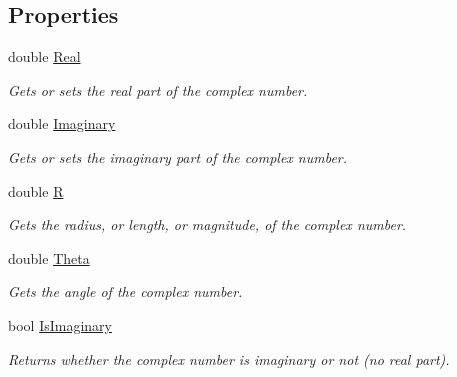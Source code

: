 \subsection*{Properties}
\begin{DoxyCompactItemize}
\item 
double \hyperlink{struct_solar_liner_1_1_complex_number_1_1_complex_a00d6891103d4daf3e5d64e20205f202a}{Real}
\begin{DoxyCompactList}\small\item\em Gets or sets the real part of the complex number. \end{DoxyCompactList}\item 
double \hyperlink{struct_solar_liner_1_1_complex_number_1_1_complex_a2298837eb7f6533771873169b38a4067}{Imaginary}
\begin{DoxyCompactList}\small\item\em Gets or sets the imaginary part of the complex number. \end{DoxyCompactList}\item 
double \hyperlink{struct_solar_liner_1_1_complex_number_1_1_complex_ac522bdd16f688cb00d0dae9d8ec390ff}{R}
\begin{DoxyCompactList}\small\item\em Gets the radius, or length, or magnitude, of the complex number. \end{DoxyCompactList}\item 
double \hyperlink{struct_solar_liner_1_1_complex_number_1_1_complex_a1cfc2066453f861b4a04ba69a2f1ad39}{Theta}
\begin{DoxyCompactList}\small\item\em Gets the angle of the complex number. \end{DoxyCompactList}\item 
bool \hyperlink{struct_solar_liner_1_1_complex_number_1_1_complex_a6d8e0e3f6ef11495a52ca1e242dd2b81}{Is\+Imaginary}
\begin{DoxyCompactList}\small\item\em Returns whether the complex number is imaginary or not (no real part). \end{DoxyCompactList}\item 

\end{DoxyCompactItemize}
